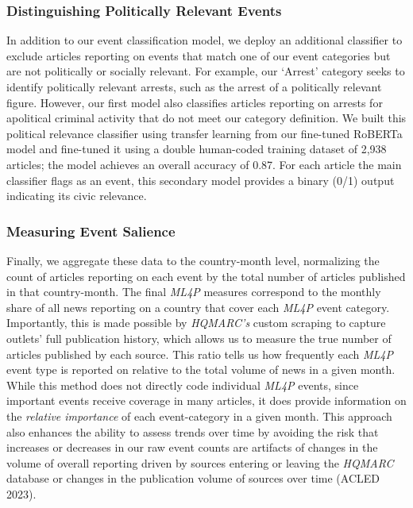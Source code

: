 \documentclass[
  letterpaper,
  DIV=11,
  numbers=noendperiod]{scrartcl}
\begin{document}
\hypertarget{distinguishing-politically-relevant-events}{%
\subsubsection{Distinguishing Politically Relevant
Events}\label{distinguishing-politically-relevant-events}}

In addition to our event classification model, we deploy an additional
classifier to exclude articles reporting on events that match one of our
event categories but are not politically or socially relevant. For
example, our `Arrest' category seeks to identify politically relevant
arrests, such as the arrest of a politically relevant figure. However,
our first model also classifies articles reporting on arrests for
apolitical criminal activity that do not meet our category definition.
We built this political relevance classifier using transfer learning
from our fine-tuned RoBERTa model and fine-tuned it using a double
human-coded training dataset of 2,938 articles; the model achieves an
overall accuracy of 0.87. For each article the main classifier flags as
an event, this secondary model provides a binary (0/1) output indicating
its civic relevance.

\hypertarget{measuring-event-salience}{%
\subsubsection{Measuring Event
Salience}\label{measuring-event-salience}}

Finally, we aggregate these data to the country-month level, normalizing
the count of articles reporting on each event by the total number of
articles published in that country-month. The final \emph{ML4P} measures
correspond to the monthly share of all news reporting on a country that
cover each \emph{ML4P} event category. Importantly, this is made
possible by \emph{HQMARC's} custom scraping to capture outlets' full
publication history, which allows us to measure the true number of
articles published by each source. This ratio tells us how frequently
each \emph{ML4P} event type is reported on relative to the total volume
of news in a given month. While this method does not directly code
individual \emph{ML4P} events, since important events receive coverage
in many articles, it does provide information on the \emph{relative
importance} of each event-category in a given month. This approach also
enhances the ability to assess trends over time by avoiding the risk
that increases or decreases in our raw event counts are artifacts of
changes in the volume of overall reporting driven by sources entering or
leaving the \emph{HQMARC} database or changes in the publication volume
of sources over time (ACLED 2023).
\end{document}

